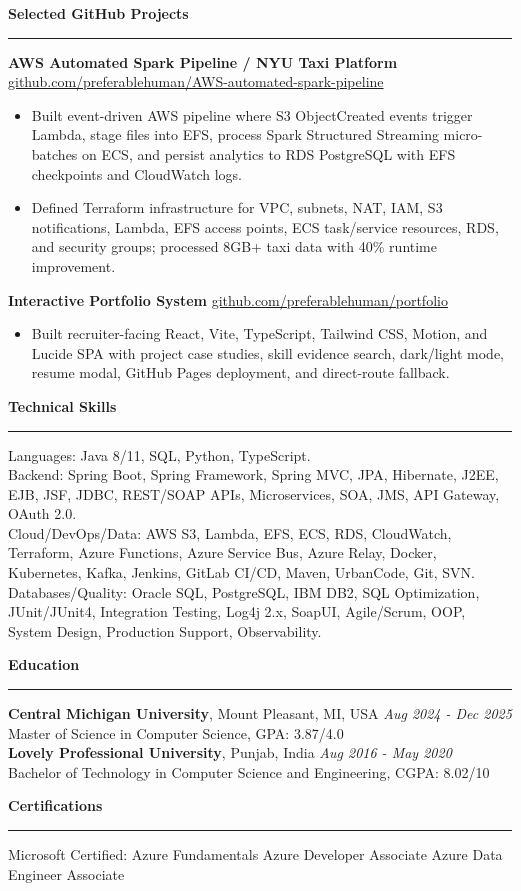 \documentclass[10pt,letterpaper]{article}
\newcommand{\ressection}[1]{\vspace{3pt}\par\textbf{#1}\par\vspace{0.9pt}\hrule\vspace{1.8pt}}
\begin{document}
\ressection{Selected GitHub Projects}
\textbf{AWS Automated Spark Pipeline / NYU Taxi Platform} \hfill \href{https://github.com/preferablehuman/AWS-automated-spark-pipeline}{github.com/preferablehuman/AWS-automated-spark-pipeline}
\begin{itemize}
  \item Built event-driven AWS pipeline where S3 ObjectCreated events trigger Lambda, stage files into EFS, process Spark Structured Streaming micro-batches on ECS, and persist analytics to RDS PostgreSQL with EFS checkpoints and CloudWatch logs.
  \item Defined Terraform infrastructure for VPC, subnets, NAT, IAM, S3 notifications, Lambda, EFS access points, ECS task/service resources, RDS, and security groups; processed 8GB+ taxi data with 40\% runtime improvement.
\end{itemize}
\textbf{Interactive Portfolio System} \hfill \href{https://github.com/preferablehuman/portfolio}{github.com/preferablehuman/portfolio}
\begin{itemize}
  \item Built recruiter-facing React, Vite, TypeScript, Tailwind CSS, Motion, and Lucide SPA with project case studies, skill evidence search, dark/light mode, resume modal, GitHub Pages deployment, and direct-route fallback.
\end{itemize}

\ressection{Technical Skills}
Languages: Java 8/11, SQL, Python, TypeScript.\\
Backend: Spring Boot, Spring Framework, Spring MVC, JPA, Hibernate, J2EE, EJB, JSF, JDBC, REST/SOAP APIs, Microservices, SOA, JMS, API Gateway, OAuth 2.0.\\
Cloud/DevOps/Data: AWS S3, Lambda, EFS, ECS, RDS, CloudWatch, Terraform, Azure Functions, Azure Service Bus, Azure Relay, Docker, Kubernetes, Kafka, Jenkins, GitLab CI/CD, Maven, UrbanCode, Git, SVN.\\
Databases/Quality: Oracle SQL, PostgreSQL, IBM DB2, SQL Optimization, JUnit/JUnit4, Integration Testing, Log4j 2.x, SoapUI, Agile/Scrum, OOP, System Design, Production Support, Observability.

\ressection{Education}
\textbf{Central Michigan University}, Mount Pleasant, MI, USA \hfill \textit{Aug 2024 - Dec 2025}\\
Master of Science in Computer Science, GPA: 3.87/4.0\\
\textbf{Lovely Professional University}, Punjab, India \hfill \textit{Aug 2016 - May 2020}\\
Bachelor of Technology in Computer Science and Engineering, CGPA: 8.02/10

\ressection{Certifications}
Microsoft Certified: Azure Fundamentals \textbar{} Azure Developer Associate \textbar{} Azure Data Engineer Associate
\end{document}
